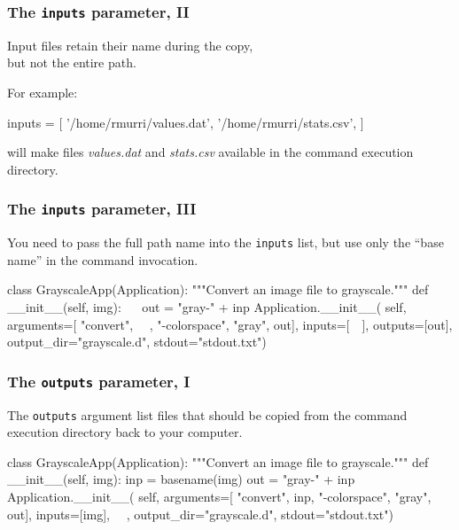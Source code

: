 \documentclass[english,serif,mathserif,xcolor=pdftex,dvipsnames,table]{beamer}
\begin{document}
\begin{frame}[fragile]
  \frametitle{The \texttt{inputs} parameter, II}

  Input files retain their name during the copy, \\ but not the entire path.

  \+
  For example:
  \begin{python}
    inputs = [
      '/home/rmurri/values.dat',
      '/home/rmurri/stats.csv',
    ]
  \end{python}
  will make files \emph{values.dat} and \emph{stats.csv} available in
  the command execution directory.

\end{frame}


\begin{frame}[fragile]
  \frametitle{The \texttt{inputs} parameter, III}

  You need to pass the full path name into the
  \texttt{inputs} list, but use only the ``base name'' in the command
  invocation.

\begin{python}
class GrayscaleApp(Application):
  """Convert an image file to grayscale."""
  def __init__(self, img):
    ~~
    out = "gray-" + inp
    Application.__init__(
      self,
      arguments=[
        "convert", ~~, "-colorspace", "gray", out],
      inputs=[~~],
      outputs=[out],
      output_dir="grayscale.d",
      stdout="stdout.txt")
\end{python}
\end{frame}


\begin{frame}[fragile]
\frametitle{The \texttt{outputs} parameter, I}

The \texttt{outputs} argument list files that should be copied from
the command execution directory back to your computer.

  \+
\begin{python}
class GrayscaleApp(Application):
  """Convert an image file to grayscale."""
  def __init__(self, img):
    inp = basename(img)
    out = "gray-" + inp
    Application.__init__(
      self,
      arguments=[
        "convert", inp, "-colorspace", "gray", out],
      inputs=[img],
      ~~,
      output_dir="grayscale.d",
      stdout="stdout.txt")
\end{python}
\end{frame}
\end{document}
